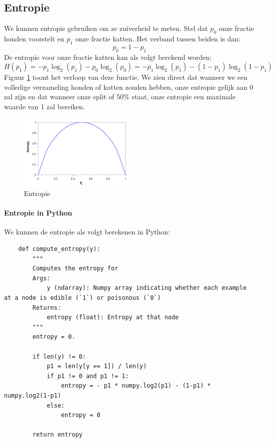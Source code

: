 \subsection{Entropie}

We kunnen entropie gebruiken om ze zuiverheid te meten. Stel dat $p_{0}$ onze fractie honden voorstelt en $p_{1}$ onze fractie katten. Het verband tussen beiden is dan:
\begin{equation}
	p_{0} = 1 - p_{1}
\end{equation}
\noindent
De entropie voor onze fractie katten kan als volgt berekend worden:
\begin{equation}
	H(p_{1}) = - p_{1} \log_{2} (p_{1}) - p_{0} \log_{2} (p_{0})
	= - p_{1} \log_{2} (p_{1}) - ( 1 - p_{1}) \log_{2} ( 1 - p_{1})
	\label{eq:entropy}
\end{equation}
\noindent
Figuur \ref{fig:entropy} toont het verloop van deze functie. We zien direct dat wanneer we een volledige verzameling honden of katten zouden hebben, onze entropie gelijk aan 0 zal zijn en dat wanneer onze split of 50$\%$ staat, onze entropie een maximale waarde van 1 zal bereiken.

\begin{figure}[h]
	\centering
	\includegraphics[width=0.5\textwidth]{images/30-entropy.png}
	\caption{Entropie}
	\label{fig:entropy}
\end{figure}

\paragraph{Entropie in Python}

We kunnen de entropie als volgt berekenen in Python:

\begin{lstlisting}
	def compute_entropy(y):
	    """
	    Computes the entropy for
	    Args:
	        y (ndarray): Numpy array indicating whether each example at a node is edible (`1`) or poisonous (`0`)
	    Returns:
	        entropy (float): Entropy at that node
	    """
	    entropy = 0.
	
	    if len(y) != 0:
	        p1 = len(y[y == 1]) / len(y)
	        if p1 != 0 and p1 != 1:
	            entropy = - p1 * numpy.log2(p1) - (1-p1) * numpy.log2(1-p1)
	        else:
	            entropy = 0
	
	    return entropy
\end{lstlisting}
\newpage

